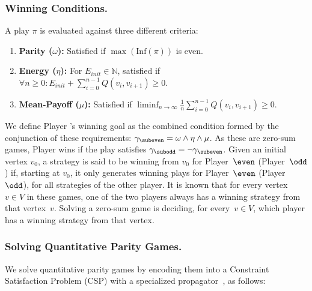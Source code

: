 \documentclass[a4paper,UKenglish,cleveref, autoref, thm-restate, anonymous]{lipics-v2021}
\begin{document}
\subsubsection{Winning Conditions.}
A play $\pi$ is evaluated against three different criteria:
%
\begin{enumerate}
    \item \textbf{Parity ($\omega$):} Satisfied if $\max(\text{Inf}(\pi))$ is even.
    \item \textbf{Energy ($\eta$):} For $E_{init} \in \mathbb{N}$, satisfied if $\forall n \ge 0: E_{init} + \sum_{i=0}^{n-1} Q(v_i, v_{i+1}) \ge 0$.
    \item \textbf{Mean-Payoff ($\mu$):} Satisfied if $\liminf_{n \to \infty} \frac{1}{n} \sum_{i=0}^{n-1} Q(v_i, v_{i+1}) \ge 0$.
\end{enumerate}

We define Player \even's winning goal as the combined condition formed by the conjunction of these requirements:
$\gamma_{\subeven} = \omega \wedge \eta \wedge \mu$. As these are zero-sum games, Player \odd wins if the play satisfies $\gamma_{\subodd} = \neg \gamma_{\subeven}$.
%
Given an initial vertex $v_0$, a strategy is said to be winning from $v_0$ for Player~$\even$ (Player~$\odd$) if, starting at $v_0$, it only generates winning plays for Player~$\even$ (Player~$\odd$), for all strategies of the other player. It is known that for every vertex~$v\in V$ in these games, one of the two players always has a winning strategy from that vertex~$v$. Solving a zero-sum game is deciding, for every~$v\in V$, which player has a winning strategy from that vertex.


\subsubsection{Solving Quantitative Parity Games.}
We solve quantitative parity games by encoding them into a Constraint Satisfaction Problem (CSP) with a specialized propagator~\cite{Hernandez:2026:noc}, as follows: 
\end{document}
